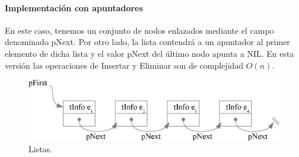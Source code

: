 \paragraph{Implementación con apuntadores}

En este caso, tenemos un conjunto de nodos enlazados mediante el campo denominado pNext. Por otro lado, la lista contendrá a un apuntador al primer elemento de dicha lista y el valor pNext del último nodo apunta a NIL. En esta versión las operaciones de Insertar y Eliminar son de complejidad $O(n)$.

\begin{figure}[!htpb]
\centering
\includegraphics[scale=.7]{images/listas.eps}
\caption{Listas.}
\label{fig:listas}
\end{figure}

